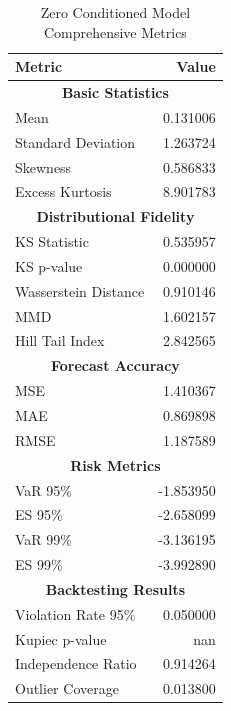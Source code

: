 \begin{table}[htbp]
\centering
\begin{tabular}{lr}
\hline
\textbf{Metric} & \textbf{Value} \\
\hline
\multicolumn{2}{c}{\textbf{Basic Statistics}} \\
\hline
Mean & 0.131006 \\
Standard Deviation & 1.263724 \\
Skewness & 0.586833 \\
Excess Kurtosis & 8.901783 \\
\hline
\multicolumn{2}{c}{\textbf{Distributional Fidelity}} \\
\hline
KS Statistic & 0.535957 \\
KS p-value & 0.000000 \\
Wasserstein Distance & 0.910146 \\
MMD & 1.602157 \\
Hill Tail Index & 2.842565 \\
\hline
\multicolumn{2}{c}{\textbf{Forecast Accuracy}} \\
\hline
MSE & 1.410367 \\
MAE & 0.869898 \\
RMSE & 1.187589 \\
\hline
\multicolumn{2}{c}{\textbf{Risk Metrics}} \\
\hline
VaR 95\% & -1.853950 \\
ES 95\% & -2.658099 \\
VaR 99\% & -3.136195 \\
ES 99\% & -3.992890 \\
\hline
\multicolumn{2}{c}{\textbf{Backtesting Results}} \\
\hline
Violation Rate 95\% & 0.050000 \\
Kupiec p-value & nan \\
Independence Ratio & 0.914264 \\
Outlier Coverage & 0.013800 \\
\hline
\end{tabular}
\caption{Zero Conditioned Model Comprehensive Metrics}
\label{tab:zero_conditioned_comprehensive_metrics}
\end{table}

